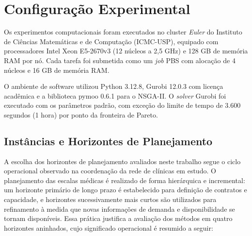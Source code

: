 \begin{quadro}[h]
	\centering
	\caption{Caracterização agregada das 10 instâncias do horizonte de 60 dias.}
	\resizebox{0.8\textwidth}{!}{\begin{minipage}{\textwidth}
			
		\end{minipage}}
	\label{quad:base-h60}
	\fautor
\end{quadro}

\begin{quadro}[h]
	\centering
	\caption{Caracterização agregada das 10 instâncias do horizonte de 90 dias.}
	\resizebox{0.8\textwidth}{!}{\begin{minipage}{\textwidth}
			
		\end{minipage}}
	\label{quad:base-h90}
	\fautor
\end{quadro}

\clearpage

\section{Configuração Experimental}
\label{cap:resultados:config-experimental}

Os experimentos computacionais foram executados no cluster \textit{Euler} do Instituto de Ciências Matemáticas e de Computação (ICMC-USP), equipado com processadores Intel Xeon E5-2670v3 (12 núcleos a 2,5 GHz) e 128 GB de memória RAM por nó. Cada tarefa foi submetida como um \textit{job} PBS com alocação de 4 núcleos e 16 GB de memória RAM.

O ambiente de software utilizou Python 3.12.8, Gurobi 12.0.3 com licença acadêmica e a biblioteca pymoo 0.6.1 para o NSGA-II. O \textit{solver}
Gurobi foi executado com os parâmetros padrão, com exceção do limite de tempo de 3.600 segundos (1 hora) por ponto da fronteira de Pareto.

\subsection{Instâncias e Horizontes de Planejamento}
\label{cap:resultados:instancias-horizontes}

A escolha dos horizontes de planejamento avaliados neste trabalho segue o ciclo operacional observado na coordenação da rede de clínicas em estudo. O planejamento das escalas médicas é realizado de forma hierárquica e incremental: um horizonte primário de longo prazo é estabelecido para definição de contratos e capacidade, e horizontes sucessivamente mais curtos são utilizados para refinamento à medida que novas informações de demanda e disponibilidade se tornam disponíveis. Essa prática justifica a avaliação dos métodos em quatro horizontes aninhados, cujo significado operacional é resumido a seguir:

